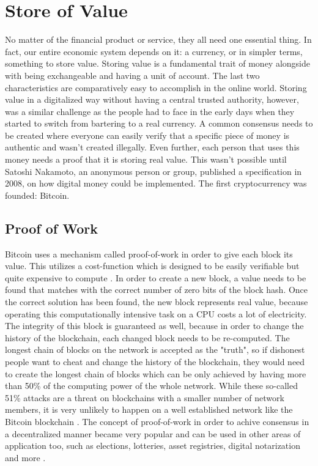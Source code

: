 \section{Store of Value}
No matter of the financial product or service, they all need one essential thing. In fact, our entire economic system depends on it: a currency, or in simpler terms, something to store value. Storing value is a fundamental trait of money alongside with being exchangeable and having a unit of account. The last two characteristics are comparatively easy to accomplish in the online world. Storing value in a digitalized way without having a central trusted authority, however, was a similar challenge as the people had to face in the early days when they started to switch from bartering to a real currency. A common consensus needs to be created where everyone can easily verify that a specific piece of money is authentic and wasn't created illegally. Even further, each person that uses this money needs a proof that it is storing real value. This wasn't possible until Satoshi Nakamoto, an anonymous person or group, published a specification \cite{Nakamoto2008} in 2008, on how digital money could be implemented. The first cryptocurrency was founded: Bitcoin.

\subsection{Proof of Work}
Bitcoin uses a mechanism called proof-of-work in order to give each block its value. This utilizes a cost-function which is designed to be easily verifiable but quite expensive to compute \cite{Back2002}. In order to create a new block, a value needs to be found that matches with the correct number of zero bits of the block hash. Once the correct solution has been found, the new block represents real value, because operating this computationally intensive task on a CPU costs a lot of electricity. The integrity of this block is guaranteed as well, because in order to change the history of the blockchain, each changed block needs to be re-computed. The longest chain of blocks on the network is accepted as the "truth", so if dishonest people want to cheat and change the history of the blockchain, they would need to create the longest chain of blocks which can be only achieved by having more than 50\% of the computing power of the whole network. While these so-called 51\% attacks are a threat on blockchains with a smaller number of network members, it is very unlikely to happen on a well established network like the Bitcoin blockchain \cite{Swan2015}. The concept of proof-of-work in order to achive consensus in a decentralized manner became very popular and can be used in other areas of application too, such as elections, lotteries, asset registries, digital notarization and more \cite{Antonopoulos2017}.

